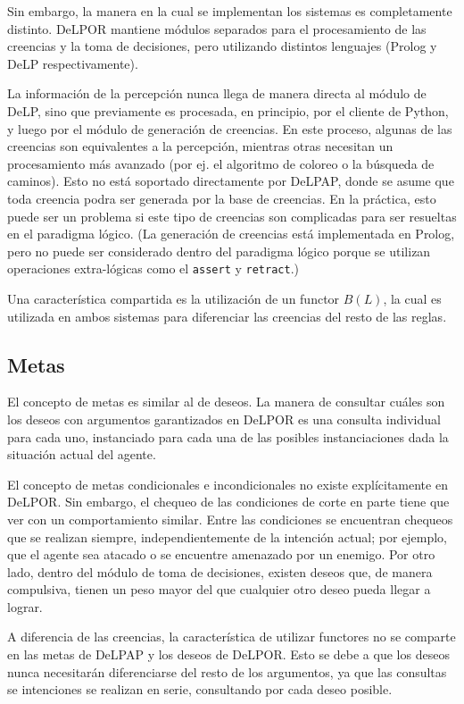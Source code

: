 Sin embargo, la manera en la cual se implementan los sistemas es completamente distinto. DeLPOR 
mantiene módulos separados para el procesamiento de las creencias y la toma de decisiones, pero 
utilizando distintos lenguajes (Prolog y DeLP respectivamente).

La información de la percepción nunca llega de manera directa al módulo de DeLP, sino que previamente 
es procesada, en principio, por el cliente de Python, y luego por el módulo de generación de 
creencias. En este proceso, algunas de las creencias son equivalentes a la percepción, mientras otras
necesitan un procesamiento más avanzado (por ej. el algoritmo de coloreo o la búsqueda de caminos).
Esto no está soportado directamente por DeLPAP, donde se asume que toda creencia podra ser generada
por la base de creencias. En la práctica, esto puede ser un problema si este tipo de creencias son 
complicadas para ser resueltas en el paradigma lógico. (La generación de creencias está implementada 
en Prolog, pero no puede ser considerado dentro del paradigma lógico porque se utilizan operaciones
extra-lógicas como el \texttt{assert} y \texttt{retract}.)

Una característica compartida es la utilización de un functor $B(L)$, la cual es utilizada en ambos
sistemas para diferenciar las creencias del resto de las reglas.

\subsection{Metas}

El concepto de metas es similar al de deseos. La manera de consultar cuáles son los deseos con 
argumentos garantizados en DeLPOR es una consulta individual para cada uno, instanciado para cada
una de las posibles instanciaciones dada la situación actual del agente.

El concepto de metas condicionales e incondicionales no existe explícitamente en DeLPOR. Sin embargo,
el chequeo de las condiciones de corte en parte tiene que ver con un comportamiento similar. Entre
las condiciones se encuentran chequeos que se realizan siempre, independientemente de la intención 
actual; por ejemplo, que el agente sea atacado o se encuentre amenazado por un enemigo. Por otro lado,
dentro del módulo de toma de decisiones, existen deseos que, de manera compulsiva, tienen un peso
mayor del que cualquier otro deseo pueda llegar a lograr. 

A diferencia de las creencias, la característica de utilizar functores no se comparte en las metas de
DeLPAP y los deseos de DeLPOR. Esto se debe a que los deseos nunca necesitarán diferenciarse del resto
de los argumentos, ya que las consultas se intenciones se realizan en serie, consultando por cada
deseo posible.

